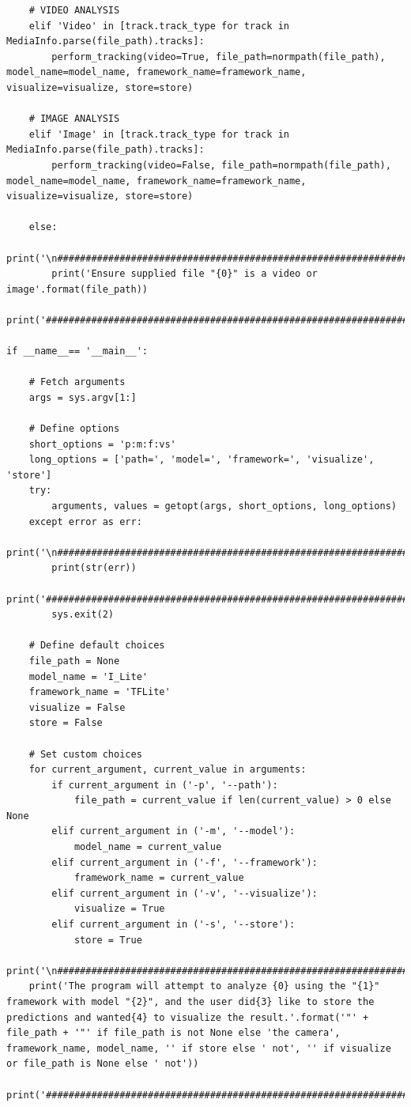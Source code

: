 \documentclass{fisatprojectfinal}
\begin{document}
\begin{appendices}
\begin{lstlisting}
    # VIDEO ANALYSIS
    elif 'Video' in [track.track_type for track in MediaInfo.parse(file_path).tracks]:
        perform_tracking(video=True, file_path=normpath(file_path), model_name=model_name, framework_name=framework_name, visualize=visualize, store=store)
        
    # IMAGE ANALYSIS
    elif 'Image' in [track.track_type for track in MediaInfo.parse(file_path).tracks]:
        perform_tracking(video=False, file_path=normpath(file_path), model_name=model_name, framework_name=framework_name, visualize=visualize, store=store)
      
    else:
        print('\n##########################################################################################################')
        print('Ensure supplied file "{0}" is a video or image'.format(file_path))
        print('##########################################################################################################\n')
    
if __name__== '__main__':
      
    # Fetch arguments
    args = sys.argv[1:]
    
    # Define options
    short_options = 'p:m:f:vs'
    long_options = ['path=', 'model=', 'framework=', 'visualize', 'store']
    try:
        arguments, values = getopt(args, short_options, long_options)
    except error as err:
        print('\n##########################################################################################################')
        print(str(err))
        print('##########################################################################################################\n')
        sys.exit(2)
    
    # Define default choices
    file_path = None
    model_name = 'I_Lite'
    framework_name = 'TFLite'
    visualize = False
    store = False

    # Set custom choices
    for current_argument, current_value in arguments:
        if current_argument in ('-p', '--path'):
            file_path = current_value if len(current_value) > 0 else None
        elif current_argument in ('-m', '--model'):
            model_name = current_value
        elif current_argument in ('-f', '--framework'):
            framework_name = current_value
        elif current_argument in ('-v', '--visualize'):
            visualize = True
        elif current_argument in ('-s', '--store'):
            store = True
    print('\n##########################################################################################################')
    print('The program will attempt to analyze {0} using the "{1}" framework with model "{2}", and the user did{3} like to store the predictions and wanted{4} to visualize the result.'.format('"' + file_path + '"' if file_path is not None else 'the camera', framework_name, model_name, '' if store else ' not', '' if visualize or file_path is None else ' not'))
    print('##########################################################################################################\n')
        

\end{lstlisting}
\end{appendices}
\end{document}
